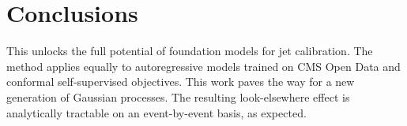 \section{Conclusions}\label{sec:conclusions}

This unlocks the full potential of foundation models for jet
calibration. The method applies equally to autoregressive models trained
on CMS Open Data and conformal self-supervised objectives. This work
paves the way for a new generation of Gaussian processes. The resulting
look-elsewhere effect is analytically tractable on an event-by-event
basis, as expected.

